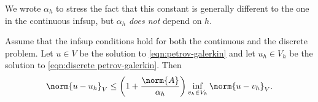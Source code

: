 \begin{remark}
    We wrote $\alpha_h$ to stress the fact that this constant is generally different to the one in the continuous infsup, but $\alpha_h$ \emph{does not} depend on $h$.
\end{remark}
\begin{lemma}
    Assume that the infsup conditions hold for both the continuous and the discrete problem. Let $u\in V$ be the solution to \eqref{eqn:petrov-galerkin} and let $u_h\in V_h$ be the solution to \eqref{eqn:discrete petrov-galerkin}. Then
    \begin{equation*}
        \norm{u-u_h}_V\leq\left( 1+\frac{\norm{A}}{\alpha_h} \right)\inf_{v_h\in V_h}\norm{u-v_h}_V.
    \end{equation*}
\end{lemma}
